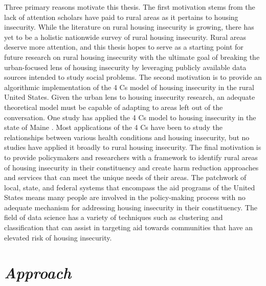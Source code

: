 Three primary reasons motivate this thesis. The first motivation stems from the lack of attention scholars have paid to rural areas as it pertains to housing insecurity. While the literature on rural housing insecurity is growing, there has yet to be a holistic nationwide survey of rural housing insecurity. Rural areas deserve more attention, and this thesis hopes to serve as a starting point for future research on rural housing insecurity with the ultimate goal of breaking the urban-focused lens of housing insecurity by leveraging publicly available data sources intended to study social problems. The second motivation is to provide an algorithmic implementation of the 4 Cs model of housing insecurity in the rural United States. Given the urban lens to housing insecurity research, an adequate theoretical model must be capable of adapting to areas left out of the conversation. One study has applied the 4 Cs model to housing insecurity in the state of Maine \citep{gleason_using_2021}. Most applications of the 4 Cs have been to study the relationships between various health conditions and housing insecurity, but no studies have applied it broadly to rural housing insecurity. The final motivation is to provide policymakers and researchers with a framework to identify rural areas of housing insecurity in their constituency and create harm reduction approaches and services that can meet the unique needs of their areas. The patchwork of local, state, and federal systems that encompass the aid programs of the United States means many people are involved in the policy-making process with no adequate mechanism for addressing housing insecurity in their constituency. The field of data science has a variety of techniques such as clustering and classification that can assist in targeting aid towards communities that have an elevated risk of housing insecurity.

 

\section{\textit{Approach}} 

